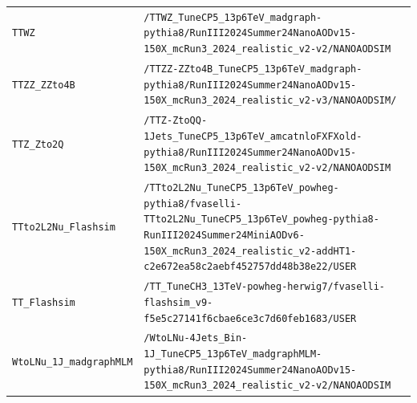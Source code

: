 \begin{longtable}{@{}>{\RaggedRight\arraybackslash}p{} >{\RaggedRight\arraybackslash}p{}@{}}
\addlinespace[2pt]
\texttt{TTWZ} & \texttt{/\allowbreak{}TTWZ\_\allowbreak{}TuneCP5\_\allowbreak{}13p6TeV\_\allowbreak{}madgraph-\allowbreak{}pythia8/\allowbreak{}RunIII2024Summer24NanoAODv15-\allowbreak{}150X\_\allowbreak{}mcRun3\_\allowbreak{}2024\_\allowbreak{}realistic\_\allowbreak{}v2-\allowbreak{}v2/\allowbreak{}NANOAODSIM} \\
\addlinespace[2pt]
\texttt{TTZZ\_\allowbreak{}ZZto4B} & \texttt{/\allowbreak{}TTZZ-\allowbreak{}ZZto4B\_\allowbreak{}TuneCP5\_\allowbreak{}13p6TeV\_\allowbreak{}madgraph-\allowbreak{}pythia8/\allowbreak{}RunIII2024Summer24NanoAODv15-\allowbreak{}150X\_\allowbreak{}mcRun3\_\allowbreak{}2024\_\allowbreak{}realistic\_\allowbreak{}v2-\allowbreak{}v3/\allowbreak{}NANOAODSIM/\allowbreak{}} \\
\addlinespace[2pt]
\texttt{TTZ\_\allowbreak{}Zto2Q} & \texttt{/\allowbreak{}TTZ-\allowbreak{}ZtoQQ-\allowbreak{}1Jets\_\allowbreak{}TuneCP5\_\allowbreak{}13p6TeV\_\allowbreak{}amcatnloFXFXold-\allowbreak{}pythia8/\allowbreak{}RunIII2024Summer24NanoAODv15-\allowbreak{}150X\_\allowbreak{}mcRun3\_\allowbreak{}2024\_\allowbreak{}realistic\_\allowbreak{}v2-\allowbreak{}v2/\allowbreak{}NANOAODSIM} \\
\addlinespace[2pt]
\texttt{TTto2L2Nu\_\allowbreak{}Flashsim} & \texttt{/\allowbreak{}TTto2L2Nu\_\allowbreak{}TuneCP5\_\allowbreak{}13p6TeV\_\allowbreak{}powheg-\allowbreak{}pythia8/\allowbreak{}fvaselli-\allowbreak{}TTto2L2Nu\_\allowbreak{}TuneCP5\_\allowbreak{}13p6TeV\_\allowbreak{}powheg-\allowbreak{}pythia8-\allowbreak{}RunIII2024Summer24MiniAODv6-\allowbreak{}150X\_\allowbreak{}mcRun3\_\allowbreak{}2024\_\allowbreak{}realistic\_\allowbreak{}v2-\allowbreak{}addHT1-\allowbreak{}c2e672ea58c2aebf452757dd48b38e22/\allowbreak{}USER} \\
\addlinespace[2pt]
\texttt{TT\_\allowbreak{}Flashsim} & \texttt{/\allowbreak{}TT\_\allowbreak{}TuneCH3\_\allowbreak{}13TeV-\allowbreak{}powheg-\allowbreak{}herwig7/\allowbreak{}fvaselli-\allowbreak{}flashsim\_\allowbreak{}v9-\allowbreak{}f5e5c27141f6cbae6ce3c7d60feb1683/\allowbreak{}USER} \\
\addlinespace[2pt]
\texttt{WtoLNu\_\allowbreak{}1J\_\allowbreak{}madgraphMLM} & \texttt{/\allowbreak{}WtoLNu-\allowbreak{}4Jets\_\allowbreak{}Bin-\allowbreak{}1J\_\allowbreak{}TuneCP5\_\allowbreak{}13p6TeV\_\allowbreak{}madgraphMLM-\allowbreak{}pythia8/\allowbreak{}RunIII2024Summer24NanoAODv15-\allowbreak{}150X\_\allowbreak{}mcRun3\_\allowbreak{}2024\_\allowbreak{}realistic\_\allowbreak{}v2-\allowbreak{}v2/\allowbreak{}NANOAODSIM} \\

\end{longtable}
